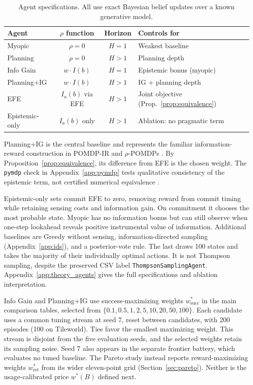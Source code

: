 \begin{table}[ht]
\centering
\caption{Agent specifications. All use exact Bayesian belief updates over a known generative model.}
\label{tab:agents}
\begin{tablebody}
\begin{tabular}{lccl}
\toprule
Agent & $\rho$ function & Horizon & Controls for \\
\midrule
Myopic & $\rho = 0$ & $H{=}1$ & Weakest baseline \\
Planning & $\rho = 0$ & $H > 1$ & Planning depth \\
Info Gain & $w \cdot I(b)$ & $H{=}1$ & Epistemic bonus (myopic) \\
Planning+IG & $w \cdot I(b)$ & $H > 1$ & IG + planning depth \\
EFE & $I_a(b)$ via EFE & $H > 1$ & Joint objective (Prop.~\ref{prop:equivalence}) \\
Epistemic-only & $I_a(b)$ only & $H > 1$ & Ablation: no pragmatic term \\
\bottomrule
\end{tabular}
\end{tablebody}
\end{table}

Planning+IG is the central baseline and represents the familiar information-reward construction in POMDP-IR and $\rho$-POMDPs \citep{spaan2015,araya2010,satsangi2018}. By Proposition~\ref{prop:equivalence}, its difference from EFE is the chosen weight. The \texttt{pymdp} check in Appendix~\ref{app:pymdp} tests qualitative consistency of the epistemic term, not certified numerical equivalence \citep{heins2022}.

Epistemic-only sets commit EFE to zero, removing reward from commit timing while retaining sensing costs and information gain. On commitment it chooses the most probable state. Myopic has no information bonus but can still observe when one-step lookahead reveals positive instrumental value of information. Additional baselines are Greedy without sensing, information-directed sampling (Appendix~\ref{app:ids}), and a posterior-vote rule. The last draws 100 states and takes the majority of their individually optimal actions. It is not Thompson sampling, despite the preserved CSV label \texttt{ThompsonSamplingAgent}. Appendix~\ref{app:theory_agents} gives the full specifications and ablation interpretation.

Info Gain and Planning+IG use success-maximizing weights $w^*_{\mathrm{succ}}$ in the main comparison tables, selected from $\{0.1,0.5,1,2,5,10,20,50,100\}$. Each candidate uses a common tuning stream at seed 7, reset between candidates, with 200 episodes (100 on Tileworld). Ties favor the smallest maximizing weight. This stream is disjoint from the five evaluation seeds, and the selected weights retain its sampling noise. Seed 7 also appears in the separate frontier battery, which evaluates no tuned baseline. The Pareto study instead reports reward-maximizing weights $w^*_{\mathrm{ret}}$ from its wider eleven-point grid (Section~\ref{sec:pareto}). Neither is the usage-calibrated price $w^*(B)$ defined next.

